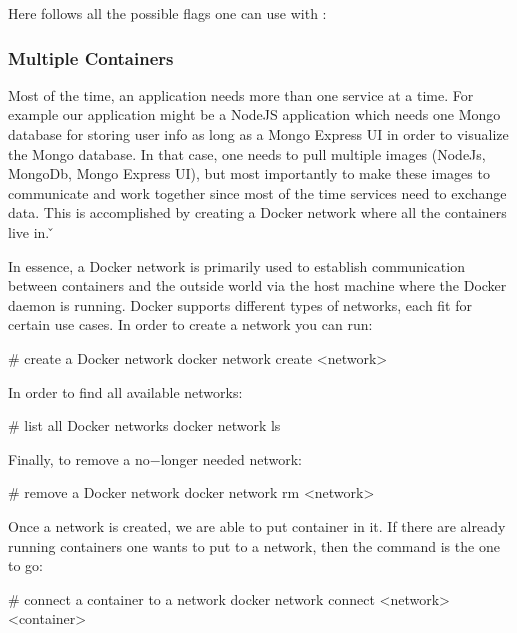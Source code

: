 Here follows all the possible flags one can use with :


\subsubsection{Multiple Containers}

Most of the time, an application needs more than one service at a time. For example our application might be a NodeJS
application which needs one Mongo database for storing user info as long as a Mongo Express UI in order to visualize
the Mongo database. In that case, one needs to pull multiple images (NodeJs, MongoDb, Mongo Express UI), but most
importantly to make these images to communicate and work together since most of the time services need to exchange
data. This is accomplished by creating a Docker network where all the containers live in. \v


In essence, a Docker network is primarily used to establish communication between containers and the outside world
via the host machine where the Docker daemon is running. Docker supports different types of networks, each fit for
certain use cases. In order to create a network you can run:

\begin{bash}
# create a Docker network
docker network create <network>
\end{bash}

In order to find all available networks:

\begin{bash}
# list all Docker networks
docker network ls
\end{bash}

Finally, to remove a no$-$longer needed network:

\begin{bash}
# remove a Docker network
docker network rm <network>
\end{bash}

Once a network is created, we are able to put container in it. If there are already running containers one wants to
put to a network, then the  command is the one to go:

\begin{bash}
# connect a container to a network
docker network connect <network> <container>
\end{bash}

